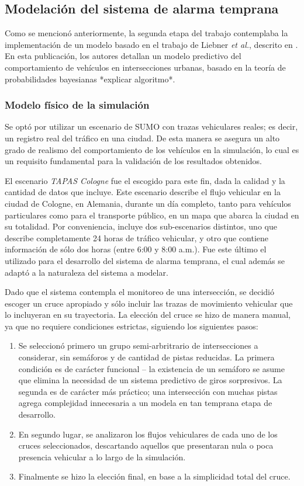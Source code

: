 \documentclass[11pt,letterpaper]{article}
\begin{document}
\newpage
\subsection{Modelación del sistema de alarma temprana}

Como se mencionó anteriormente, la segunda etapa del trabajo contemplaba la implementación de un modelo basado en el trabajo de Liebner \emph{et al.}, descrito en \cite{prediction-paper}. En esta publicación, los autores detallan un modelo predictivo del comportamiento de vehículos en intersecciones urbanas, basado en la teoría de probabilidades bayesianas *explicar algoritmo*.

\subsubsection{Modelo físico de la simulación}

Se optó por utilizar un escenario de SUMO con trazas vehiculares reales; es decir, un registro real del tráfico en una ciudad. De esta manera se asegura un alto grado de realismo del comportamiento de los vehículos en la simulación, lo cual es un requisito fundamental para la validación de los resultados obtenidos.

El escenario \emph{TAPAS Cologne} \cite{tapascologne} fue el escogido para este fin, dada la calidad y la cantidad de datos que incluye. Este escenario describe el flujo vehicular en la ciudad de Cologne, en Alemania, durante un día completo, tanto para vehículos particulares como para el transporte público, en un mapa que abarca la ciudad en su totalidad. Por conveniencia, incluye dos sub-escenarios distintos, uno que describe completamente 24 horas de tráfico vehicular, y otro que contiene información de sólo dos horas (entre 6:00 y 8:00 a.m.). Fue este último el utilizado para el desarrollo del sistema de alarma temprana, el cual además se adaptó a la naturaleza del sistema a modelar.

Dado que el sistema contempla el monitoreo de una intersección, se decidió escoger un cruce apropiado y sólo incluir las trazas de movimiento vehicular que lo incluyeran en su trayectoria. La elección del cruce se hizo de manera manual, ya que no requiere condiciones estrictas, siguiendo los siguientes pasos:

\begin{enumerate}
	\item Se seleccionó primero un grupo semi-arbritrario de intersecciones a considerar, sin semáforos y de cantidad de pistas reducidas. La primera condición es de carácter funcional -- la existencia de un semáforo se asume que elimina la necesidad de un sistema predictivo de giros sorpresivos. La segunda es de carácter más práctico; una intersección con muchas pistas agrega complejidad innecesaria a un modela en tan temprana etapa de desarrollo.
	\item En segundo lugar, se analizaron los flujos vehiculares de cada uno de los cruces seleccionados, descartando aquellos que presentaran nula o poca presencia vehicular a lo largo de la simulación.
	\item Finalmente se hizo la elección final, en base a la simplicidad total del cruce.
\end{enumerate}
\end{document}
